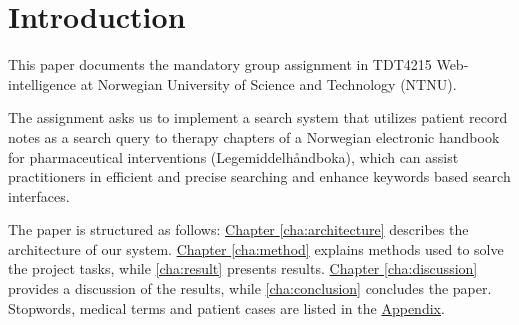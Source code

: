 \chapter{Introduction}
This paper documents the mandatory group assignment in TDT4215 Web-intelligence
at Norwegian University of Science and Technology (NTNU).

The assignment asks us to implement a search system that utilizes patient
record notes as a search query to therapy chapters of a Norwegian electronic
handbook for pharmaceutical interventions (Legemiddelhåndboka), which can
assist practitioners in efficient and precise searching and enhance keywords
based search interfaces.

The paper is structured as follows:
\hyperref[cha:architecture]{Chapter \ref*{cha:architecture}} describes the
architecture of our system.
\hyperref[cha:method]{Chapter \ref*{cha:method}} explains methods used to
solve the project tasks, while \autoref{cha:result} presents results.
\hyperref[cha:discussion]{Chapter \ref*{cha:discussion}} provides a discussion
of the results, while \autoref{cha:conclusion} concludes the paper.
Stopwords, medical terms and patient cases are listed in the
\hyperref[appendix]{Appendix}.
